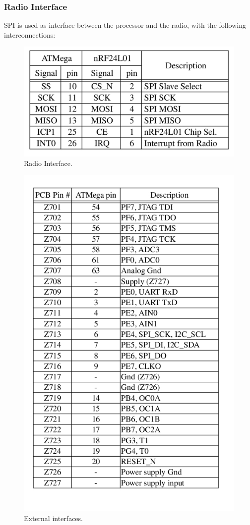 \documentclass[a4paper,10pt]{report}
\begin{document}
\subsubsection{Radio Interface}
SPI is used as interface between the processor and the radio, with the following interconnections:
\begin{figure}[!h]
 \centering
 \includegraphics[width = 0.7 \textwidth] {table1}
 \caption{Radio Interface.}
 \label{table1}
\end{figure}
\newline
\begin{figure}[!h]
 \centering
 \includegraphics[width = 0.7 \textwidth] {table2}
 \caption{External interfaces.}
 \label{table2}
\end{figure}
\end{document}
